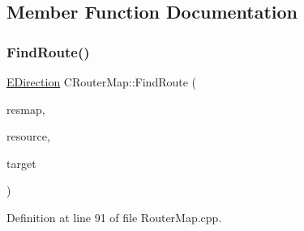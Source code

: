 \subsection{Member Function Documentation}
\hypertarget{classCRouterMap_ac638dca74d6ebe3602db9f7c69881146}{}\label{classCRouterMap_ac638dca74d6ebe3602db9f7c69881146} 
\subsubsection{\texorpdfstring{Find\+Route()}{FindRoute()}}
{\footnotesize\ttfamily \hyperlink{GameDataTypes_8h_acb2b033915f6659a71a38b5aa6e4eb42}{E\+Direction} C\+Router\+Map\+::\+Find\+Route (\begin{DoxyParamCaption}\item[{const \hyperlink{classCAssetDecoratedMap}{C\+Asset\+Decorated\+Map} \&}]{resmap,  }\item[{const \hyperlink{classCPlayerAsset}{C\+Player\+Asset} \&}]{resource,  }\item[{const \hyperlink{classCPosition}{C\+Position} \&}]{target }\end{DoxyParamCaption})}



Definition at line 91 of file Router\+Map.\+cpp.


